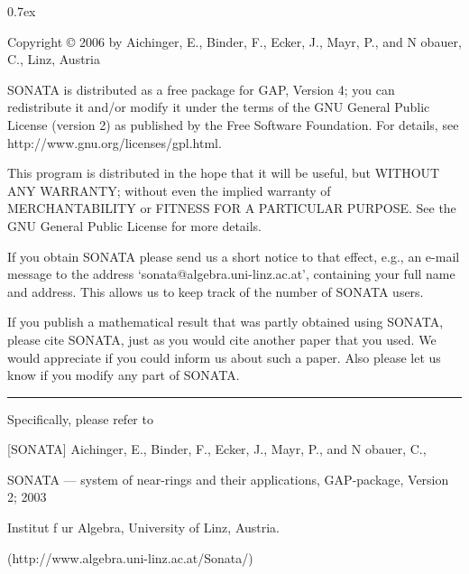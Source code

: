 


\begingroup
\def\"#1{\accent127 #1}
\parindent 0pt
\parskip 0.7ex

{\everypar{\hangindent\manindent}
Copyright {\copyright} 2006 by\hfill\break
Aichinger, E., Binder, F., Ecker, J., Mayr, P., and N{\"o}bauer, C.,\hfill{} Linz, Austria}

\medskip

 SONATA  is  distributed as a free package for GAP, Version 4;
 you can redistribute it and/or
 modify it under the terms of the GNU General Public License (version 2)
 as published by the Free Software Foundation.
 For details, see http://www.gnu.org/licenses/gpl.html.

 This program is distributed in the hope that it will be useful,
 but WITHOUT ANY WARRANTY; without even the implied warranty of
 MERCHANTABILITY or FITNESS FOR A PARTICULAR PURPOSE.  See the
 GNU General Public License for more details.

 If you obtain SONATA please send us  a short notice to that effect,
 e.g., an  e-mail  message   to  the  address
 `sonata@algebra.uni-linz.ac.at',
 containing your full  name and address. 
 This  allows us to keep track of the number of SONATA users.

 If you  publish  a mathematical  result  that  was  partly obtained using
 SONATA, please cite SONATA, just as you would cite another paper that you
 used.\* We would appreciate if you could inform us  about such a paper.
 Also please let us know if you  modify any part of SONATA.


\vfill\hrule

\noindent\llap{\*\enspace}Specifically, please refer to

\smallskip \parindent4pc \parskip 0pt
\item{[SONATA]}
Aichinger, E., Binder, F., Ecker, J., Mayr, P., and N{\"o}bauer, C.,
\item{} SONATA --- system of near-rings and their applications, GAP-package, Version 2;
2003
\item{} Institut f\"ur Algebra, University of Linz, Austria.
\item{} (http://www.algebra.uni-linz.ac.at/Sonata/)
\endgroup


